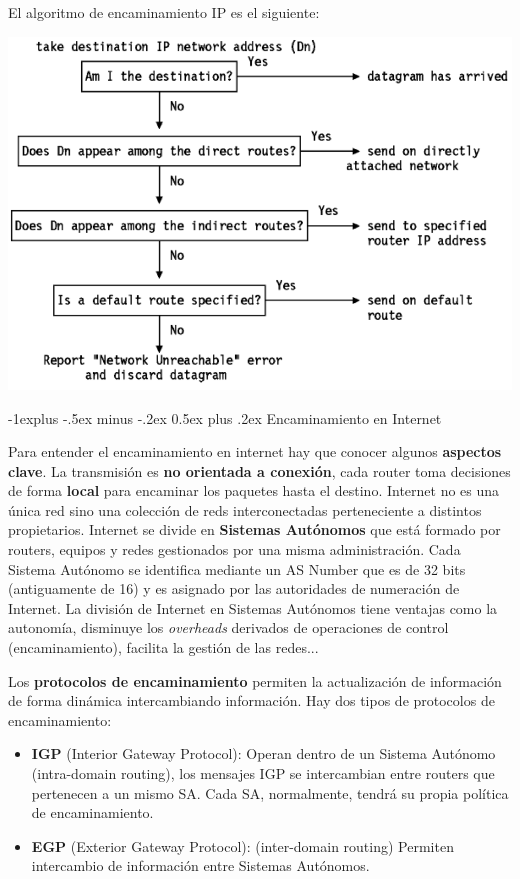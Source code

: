 \documentclass[10pt,portrait, twocolumn]{article}
\makeatletter
\renewcommand{\subsection}{\@startsection{subsection}{2}{0mm}%
                                {-1explus -.5ex minus -.2ex}%
                                {0.5ex plus .2ex}%
                                {\normalfont\normalsize\bfseries}}
\makeatother
\begin{document}
El algoritmo de encaminamiento IP es el siguiente:
	\begin{center}
		\includegraphics[scale = .5]{AlgoritmoIP}
	\end{center}

\subsection{Encaminamiento en Internet}

Para entender el encaminamiento en internet hay que conocer algunos \textbf{aspectos clave}.  La transmisión es \textbf{no orientada a conexión}, cada router toma decisiones de forma \textbf{local} para encaminar los paquetes hasta el destino. Internet no es una única red sino una colección de reds interconectadas perteneciente a distintos propietarios. Internet se divide en \textbf{Sistemas Autónomos} que está formado por routers, equipos y redes gestionados por una misma administración. Cada Sistema Autónomo se identifica mediante un AS Number que es de 32 bits (antiguamente de 16) y es asignado por las autoridades de numeración de Internet. La división de Internet en Sistemas Autónomos tiene ventajas como la autonomía, disminuye los \textit{overheads} derivados de operaciones de control (encaminamiento), facilita la gestión de las redes...

Los \textbf{protocolos de encaminamiento} permiten la actualización de información de forma dinámica intercambiando información. Hay dos tipos de protocolos de encaminamiento:

	\begin{itemize}
		\item \textbf{IGP} (Interior Gateway Protocol): Operan dentro de un Sistema Autónomo (intra-domain routing), los mensajes IGP se intercambian entre routers que pertenecen a un mismo SA. Cada SA, normalmente, tendrá su propia política de encaminamiento.
		\item \textbf{EGP} (Exterior Gateway Protocol): (inter-domain routing) Permiten intercambio de información entre Sistemas Autónomos.
	\end{itemize}
	
\end{document}
